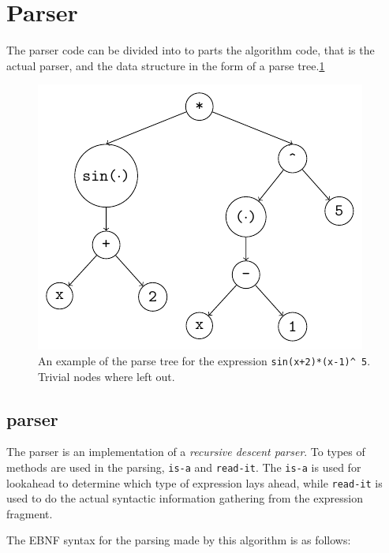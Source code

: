 \documentclass[a4paper,11pt]{kth-mag}
\begin{document}
\section{Parser}
The parser code can be divided into to parts the algorithm code, that is the 
actual parser, and the data structure in the form of a parse
tree.\ref{fig:parsetree}

\begin{figure}[ht]
\begin{center}
    \includegraphics[width=\textwidth]{parse-tree.pdf}
    \caption{\small{
        An example of the parse tree for the
        expression \texttt{sin(x+2)*(x-1)}\texttt{\^~}\!\!\texttt{5}.
        Trivial nodes where left out.
    }}
   \label{fig:parsetree}
\end{center}
\end{figure}

\subsection{parser}
The parser is an implementation of a \emph{recursive descent parser}. To
types of methods are used in the parsing, \texttt{is-a} and \texttt{read-it}.
The \texttt{is-a} is used for lookahead to determine which type of expression
lays ahead, while \texttt{read-it} is used to do the actual syntactic information
gathering from the expression fragment.

The EBNF syntax for the parsing made by this algorithm is as follows:\\

\end{document}
